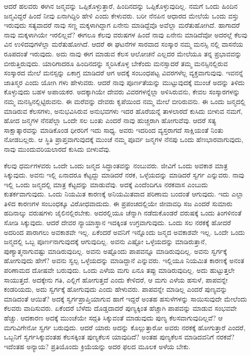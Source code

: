 ಆದರೆ ಹಲವರು ಈಗಿನ ಜನ್ಮವನ್ನು ಒಪ್ಪಿಕೊಳ್ಳುತ್ತಾರೆ, ಹಿಂದಿನದನ್ನು ಒಪ್ಪಿಕೊಳ್ಳುವುದಿಲ್ಲ. ನಮಗೆ ಒಂದು ಹಿಂದಿನ ಜನ್ಮವಿದ್ದರೆ ಹಿಂದೆ ನೀವು ಏನಾಗಿದ್ದಿರಿ ಹೇಳಿ ಎಂದು ಕೇಳುವರು. ಬರೀ ನೆನಪಿನ ಆಧಾರದ ಮೇಲೆಯೆ ಒಂದು ವಸ್ತು ಇರುವುದು ಸತ್ಯವಾದರೆ ನಾವು ಸಣ್ಣ ಮಕ್ಕಳಾಗಿದ್ದಾಗ ಏನೇನು ಮಾಡಿದ್ದೆವೊ ಅವೆಲ್ಲಾ ಮರೆತುಹೋಗಿದೆ. ಹಾಗಾದರೆ ನಾವು ಮಕ್ಕಳಾಗಿಯೇ ಇರಲಿಲ್ಲವೆ? ಈಗಲೂ ಕೆಲವು ವರುಷಗಳ ಹಿಂದೆ ನಾವು ಏನೇನು ಮಾಡಿದೆವೋ ಅದರಲ್ಲೆ ಕೆಲವು ವಿನ ಉಳಿದವುಗಳೆಲ್ಲಾ ಮರೆತುಹೋಗಿದೆ. ಆದರೆ ಈ ಘಟನೆಗಳ ಸಾರವಾದ ಸಂಸ್ಕಾರ ನಮ್ಮ ಮನಸ್ಸಿ ನಲ್ಲಿ ವಾಸನೆಯ ರೂಪದಂತೆ ಇರುವುದು. ಅದು ನಾವು ಈಗ ಮಾಡುವ ಕೆಲಸ ಆಲೋಚನೆ ಎಲ್ಲದರ ಮೇಲೆಯೂ ತನ್ನ ಪ್ರಭಾವವನ್ನು ಬೀರುತ್ತಿರುವುದು. ಯಾರಿಗಾದರೂ ಹಿಂದಿನದನ್ನು ಸ್ಮರಿಸಿಕೊಳ್ಳ ಬೇಕೆಂದು ಮನಸ್ಸಾದರೆ ತಮ್ಮ ಮನಸ್ಸಿನಲ್ಲಿರುವ ಸಂಸ್ಕಾರದ ಮೇಲೆ ಮನಸ್ಸನ್ನು ಏಕಾಗ್ರ ಮಾಡಿದರೆ ಆಗ ಅದಕ್ಕೆ ಸಂಬಂಧಪಟ್ಟ ವಿವರಗಳೆಲ್ಲ ವ್ಯಕ್ತವಾಗುವುವು. ಇವನನ್ನೆ ಜಾತಿಸ್ಮರ ಎಂದು ಯೋಗಿ ಗಳು ಹೇಳುವರು. ಆದರೆ ನಾವು ಪೂರ್ಣತೆಯನ್ನು ಮುಟ್ಟುವುದಕ್ಕೆ ಮುಂಚೆ ಅದನ್ನು ತಿಳಿದು ಕೊಳ್ಳುವುದು ಬಹಳ ಅಪಾಯಕರ. ಅದಕ್ಕಾಗಿಯೇ ದೇವರು ವಿವರಗಳನ್ನೆಲ್ಲಾ ಅಳಿಸಿರುವನು, ಕೇವಲ ಸಂಸ್ಕಾರಗಳನ್ನು ನಮ್ಮ ಮನಸ್ಸಿನಲ್ಲಿಟ್ಟಿರುವನು. ಈ ಮರೆವನ್ನು ದೇವರು ಕೃಪೆಯಿಂದ ನಮ್ಮ ಮೇಲೆ ಬೀರಿರುವನು. ಈ ಒಂದು ಜನ್ಮದಲ್ಲಿ ಮಾಡಿರುವ ಕೆಲಸಗಳು, ಅನುಭವಿಸಿರುವ ಅನುಭವಗಳು ಇದರ ಹೊರೆಯನ್ನೆ ತಾಳಲಾರದೆ ಕುಸಿದು ಬೀಳುವ ನಮಗೆ, ಹೋದ ಜನ್ಮಗಳ ನೆನಪೆಲ್ಲಾ ಒಂದೇ ಸಲ ಬಂತು ಎಂದರೆ ನಾವು ಹುಚ್ಚರಾಗಿ ಹೋಗುವೆವು. ಆದರೆ ಸತ್ಯ ಸಾಕ್ಷಾತ್ಕಾರವನ್ನು ಮಾಡಿಕೊಂಡ ಧೀರರಿಗೆ ಇದು ಸಾಧ್ಯ. ಅವರು ಇದರಿಂದ ವ್ಯಸ್ತರಾಗದೆ ಸಾಕ್ಷಿಯಂತೆ ನಿಂತು ನೋಡಬಲ್ಲರು. ಆ ಸ್ಥಿತಿ ಪ್ರಾಪ್ತವಾಗುವುದಕ್ಕೆ ಮುಂಚೆ ನಮ್ಮ ಪೂರ್ವ ಜನ್ಮಗಳ ನೆನಪು ಒಂದು ಹೆಣಭಾರವಾಗುವುದು, ನಾವು ಮುಂದುವರಿಯಲಾರದೆ ಕುಸಿದು ಬೀಳುವೆವು. 

ಕೆಲವು ಧರ್ಮಗಳವರು ಒಂದೇ ಒಂದು ಜನ್ಮದ ಸಿದ್ಧಾಂತವನ್ನು ನಂಬುವರು. ಜೀವಿಗೆ ಒಂದು ಅವಕಾಶ ಮಾತ್ರ ಸಿಕ್ಕುವುದು. ಅವನು ಇಲ್ಲಿ ಏನಾದರೂ ಕೆಟ್ಟದ್ದು ಮಾಡಿದರೆ ನರಕ, ಒಳ್ಳೆಯದನ್ನು ಮಾಡಿದರೆ ಸ್ವರ್ಗ ಎನ್ನುವರು. ನಾವು ಇಲ್ಲಿ ಒಂದು ಜನ್ಮದಲ್ಲಿ ಮಾತ್ರ ಕೆಟ್ಟದನ್ನು ಮಾಡುವೆವು. ಅದಕ್ಕೆ ಎಂದೆಂದಿಗೂ ನರಕವಾಸ ಎಂಬುದು ಕುತರ್ಕವಾಗುವುದು. ಒಂದು ನಿಯಮಿತ ಕಾರಣಕ್ಕೆ  ಅನಿಯಮಿತವಾದ  ಪರಿಣಾಮ ಬಂದಂತೆ ಆಗುವುದು. ಇದು ಎಲ್ಲಾ ತಿಳಿದ ಕಾರಣಗಳ ಸಂಬಂಧಕ್ಕೂ ವಿರೋಧವಾದುದು. ಈ ಪ್ರಪಂಚದಲ್ಲಿಯೇ ಜೀವಾವಧಿ ಸಜ ಎಂದರೆ ಸುಮಾರು ಹದಿನಾಲ್ಕು ವರುಷಗಳು ಜೈಲಿನಲ್ಲಿರಬೇಕು. ಅದರಲ್ಲಿಯೂ ಚೆನ್ನಾಗಿ ನಡೆದುಕೊಂಡರೆ ವರುಷಕ್ಕೆ ಒಂದು ತಿಂಗಳಿನಂತೆ ಸೋಡಿ ಸಿಕ್ಕುವುದು. ಆದರೆ ದೇವರ ನ್ಯಾಯಾಸ್ಥಾನ ಇದಕ್ಕಿಂತ ಉಗ್ರವಾಗುವುದು. ಒಂದು ಸಲ ನರಕಕ್ಕೆ ಹೋದರೆ ಅದರಿಂದ ಪಾರಾಗಲು ಅವಕಾಶವೇ ಇಲ್ಲ. ಏಕೆಂದರೆ ಅವನಿಗೆ ಇನ್ನೊಂದು ಜನ್ಮದ ಅವಕಾಶವೇ ಇಲ್ಲ. ಒಂದೇ ಒಂದು ಜನ್ಮದಲ್ಲಿ ಒಬ್ಬ ಪೂರ್ಣನಾಗುವುದಕ್ಕೆ ಆಗುವುದಿಲ್ಲ. ಅವನು ಎಷ್ಟೋ ಒಳ್ಳೆಯದನ್ನು ಮಾಡಿರುತ್ತಾನೆ, ಪುಣ್ಯಾತ್ಮನಾಗುವಷ್ಟು ಮಾಡಿರುವುದಿಲ್ಲ. ಅವನು ಅಷ್ಟೊಂದು ಪಾಪವನ್ನೂ ಮಾಡಿರುವುದಿಲ್ಲ. ಅವನು ಸ್ವರ್ಗಕ್ಕೆ ಹೋಗುವುದು ಹೇಗೆ? ಅವನು ಸ್ವಲ್ಪ ಒಳ್ಳೆಯದನ್ನು ಮಾಡಿದ್ದಾನೆ ಎನ್ನುವರು. ಇಲ್ಲಿಯೂ ನಿಯಮಿತ ಕಾರಣಕ್ಕೆ ಅನಂತ ಪರಿಣಾಮದ ದೋಷವೇ ಬರುವುದು. ಒಂದು ಎಳೆಯ ಮಗು ಏನೂ ತಪ್ಪು ಮಾಡಿರುವುದಿಲ್ಲ. ಅದು ಹುಟ್ಟುತ್ತಲೇ ಸಾಯುತ್ತದೆ. ಅದಕ್ಕೇನು ಗತಿ, ಎಲ್ಲಿಗೆ ಹೋಗುತ್ತದೆ ಎಂದು ಕೇಳಿದರೆ, ಆ ಮಗು ಎಳೆಯ ಹಸುಳೆ, ಪಾಪವನ್ನೇ ಕಂಡರಿಯದು, ಅದು ಸ್ವರ್ಗಕ್ಕೆ ಹೋಗುವುದು ಎಂದು ಹೇಳುವರು. ಪಾಪವನ್ನೇ ಮಾಡಿಲ್ಲ ಎಂದರೆ ಪುಣ್ಯವನ್ನು ಮಾಡಿದಂತೆ ಆಯಿತೆ? ಅದಕ್ಕೆ ಸ್ವರ್ಗಪ್ರಾಪ್ತಿಯಾಗುವ ಹಾಗೆ ಇದ್ದರೆ ಅಂತಹ ಹಸುಳೆಗಳನ್ನು ಸಾಯಿಸುವುದೇ ಮೇಲೆಂದು ಕೆಲವರು ವಾದಿಸುವರು. ಏಕೆಂದರೆ ಬೆಳೆದು ದೊಡ್ಡದಾದರೆ ಪುಣ್ಯಕ್ಕಿಂತ ಹೆಚ್ಚಾಗಿ ಪಾಪವನ್ನು ಮಾಡುವ ಸಂಭವವೇ ಹೆಚ್ಚು. ಆದಕಾರಣ ಅದಕ್ಕೆ ಮುಂಚೆಯೇ ಸದ್ಗತಿ ಸಿಕ್ಕುವಂತೆ ಮಾಡುವುದು ಪುಣ್ಯ ಕೆಲಸವಾಗುವುದಿಲ್ಲವೆ? ಆ ಮಗುವಿಗೇನೋ ಸ್ವರ್ಗ ಬರುವುದು. ಆದರೆ ಯಾರು ಅದನ್ನು ಕೊಲ್ಲುತ್ತಾರೋ ಅವರು ನರಕಕ್ಕೆ ಹೋಗುತ್ತಾರೆ ಎಂದರೆ, ಒಬ್ಬನಿಗೆ ಸ್ವರ್ಗಸಿಕ್ಕುವಂತಹ ಕೆಲಸಕ್ಕಿಂತ ಪುಣ್ಯಕೆಲಸ ಯಾವುದಿದೆ? ಅಂತಹ ಪುಣ್ಯಕೆಲಸ ಮಾಡಿದವನಿಗೆ ನರಕವೆ? ಇದೆಂತಹ ಅನ್ಯಾಯ? ಪ್ರತಿಯೊಂದು ಕ್ರಿಯೆಯನ್ನು ಅದರ ಫಲದ ಮೂಲಕ ಅಳೆಯ ಬೇಕು.

